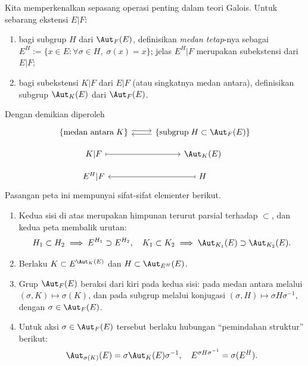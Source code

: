 Kita memperkenalkan sepasang operasi penting dalam teori Galois. Untuk sebarang ekstensi $E|F$:
\begin{enumerate}
	\item bagi subgrup $H$ dari $\Aut_F(E)$, definisikan \emph{medan tetap}-nya sebagai $E^H:=\{x\in E:\forall\sigma\in H,\;\sigma(x)=x\}$; jelas $E^H|F$ merupakan subekstensi dari $E|F$;
	\item bagi subekstensi $K|F$ dari $E|F$ (atau singkatnya medan antara), definisikan subgrup $\Aut_K(E)$ dari $\Aut_F(E)$.
\end{enumerate}
Dengan demikian diperoleh
\begin{equation}\label{eqn:Galois-corr}\begin{tikzcd}[row sep=small]
	\left\{ \text{medan antara}\; K  \right\} \arrow[yshift=0.5ex, r] & \left\{\text{subgrup}\; H \subset \Aut_F(E) \right\} \arrow[yshift=-0.5ex, l] \\
	K|F \arrow[r, mapsto] & \Aut_K(E) \\
	E^H|F & H \arrow[l, mapsto]
\end{tikzcd}\end{equation}
Pasangan peta ini mempunyai sifat-sifat elementer berikut.
\begin{enumerate}
	\item Kedua sisi di atas merupakan himpunan terurut parsial terhadap $\subset$, dan kedua peta membalik urutan:
		\[ H_1 \subset H_2 \implies E^{H_1} \supset E^{H_2}, \quad K_1 \subset K_2 \implies \Aut_{K_1}(E) \supset \Aut_{K_2}(E). \]
	\item Berlaku $K\subset E^{\Aut_K(E)}$ dan $H\subset\Aut_{E^H}(E)$.
	\item Grup $\Aut_F(E)$ beraksi dari kiri pada kedua sisi: pada medan antara melalui $(\sigma,K)\mapsto\sigma(K)$, dan pada subgrup melalui konjugasi $(\sigma,H)\mapsto\sigma H\sigma^{-1}$, dengan $\sigma\in\Aut_F(E)$.
	\item Untuk aksi $\sigma\in\Aut_F(E)$ tersebut berlaku hubungan ``pemindahan struktur'' berikut:
		\[ \Aut_{\sigma(K)}(E) = \sigma \Aut_K(E) \sigma^{-1}, \quad E^{\sigma H \sigma^{-1}} = \sigma(E^H). \]
\end{enumerate}

